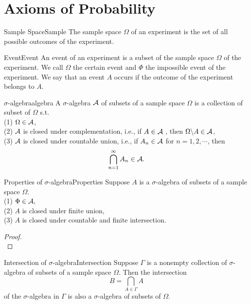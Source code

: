 \documentclass{elegantbook}
\author{杨敬轩}
\date{\today}
\begin{document}
\maketitle
\tableofcontents
\mainmatter
\chapter{Axioms of Probability}

\begin{definition}{Sample Space}{Sample}
The sample space $\Omega$ of an experiment is the set of all possible outcomes of the experiment.
\end{definition}

\begin{definition}{Event}{Event}
An event of an experiment is a subset of the sample space $\Omega$ of the experiment. 
We call $\Omega$ the certain event and $\Phi$ the impossible event of the experiment. 
We say that an event $A$ occurs if the outcome of the experiment belongs to $A$.
\end{definition}

\begin{definition}{$\sigma$-algebra}{algebra}
A $\sigma$-algebra $\mathcal{A}$ of subsets of a sample space $\Omega$ is a collection of subset of $\Omega$ s.t.\\
(1) $\Omega\in\mathcal{A}$,\\
(2) $\mathcal{A}$  is closed under complementation, i.e., if $A\in\mathcal{A}$ , then $\Omega\backslash A\in\mathcal{A}$,\\
(3) $\mathcal{A}$  is closed under countable union, i.e., if $A_n\in\mathcal{A}$ for $n=1,2,\cdots$, then $$\bigcap_{n=1}^\infty A_n \in\mathcal{A}.$$
\end{definition}

\begin{theorem}{Properties of $\sigma$-algebra}{Properties}
Suppose $A$ is a $\sigma$-algebra of subsets of a sample space $\Omega$.
\\
(1) $\Phi\in\mathcal{A},$\\
(2) $A$ is closed under f\/inite union,\\
(3) $A$ is closed under countable and f\/inite intersection.
\end{theorem}

\begin{proof}
\\[4cm]\vspace{0.01cm}
\end{proof}

\begin{theorem}{Intersection of $\sigma$-algebra}{Intersection}
Suppose $\Gamma$ is a nonempty collection of $\sigma$-algebra of subsets of a sample space $\Omega$. Then the intersection $$B=\bigcap_{A\in\Gamma}A$$ of the $\sigma$-algebra in $\Gamma$ is also a $\sigma$-algebra of subsets of $\Omega$.
\end{theorem}
\end{document}
